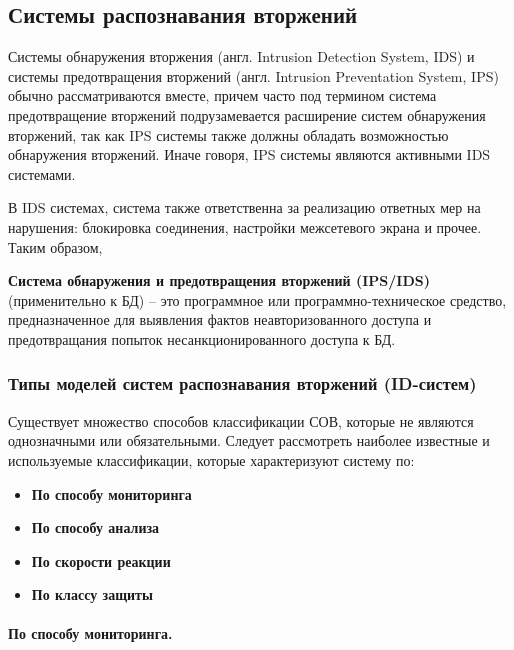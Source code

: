 \subsection{Системы распознавания вторжений}

Системы обнаружения вторжения (англ. Intrusion Detection System, IDS) и системы 
предотвращения вторжений (англ. Intrusion Preventation System, IPS) обычно рассматриваются 
вместе, причем часто под термином система предотвращение вторжений подрузамевается
расширение систем обнаружения вторжений, так как IPS системы также должны обладать 
возможностью обнаружения вторжений. Иначе говоря, IPS системы являются активными IDS системами.

В IDS системах, система также ответственна за реализацию ответных мер на нарушения: 
блокировка соединения, настройки межсетевого экрана и прочее. Таким образом,

\textbf{Система обнаружения и предотвращения вторжений (IPS/IDS)} (применительно к БД) -- это 
программное или программно-техническое средство, предназначенное для выявления фактов 
неавторизованного доступа и предотвращания попыток несанкционированного доступа к БД.



\subsubsection{Типы моделей систем распознавания вторжений (ID-систем)}

Существует множество способов классификации СОВ, которые не являются однозначными или 
обязательными. Следует рассмотреть наиболее известные и используемые классификации, 
которые характеризуют систему по:
\begin{itemize}
	\item \textbf{По способу мониторинга}
	
	\item \textbf{По способу анализа}
	
	\item \textbf{По скорости реакции}
	
	\item \textbf{По классу защиты}
\end{itemize}


\paragraph*{По способу мониторинга.}

